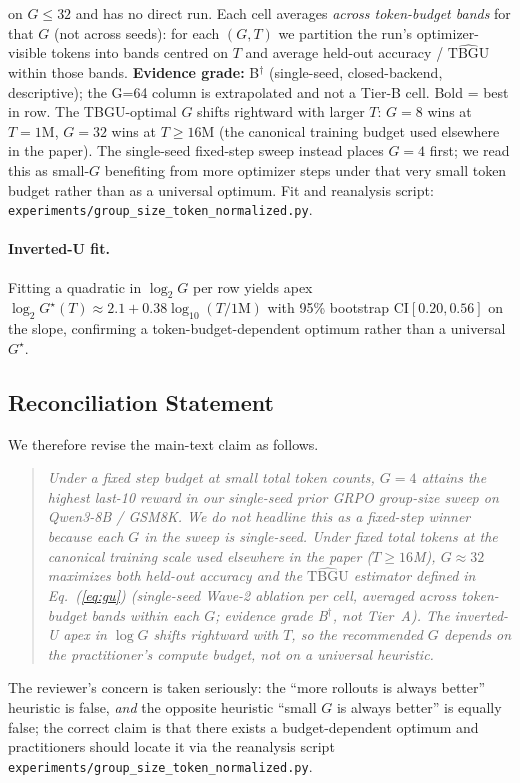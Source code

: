 \begin{table}[ht]
{on $G\le 32$ and has no direct run.
Each cell averages \emph{across token-budget bands} for that $G$ (not
across seeds): for each $(G,T)$ we partition the run's optimizer-visible
tokens into bands centred on $T$ and average held-out accuracy /
$\widehat{\mathrm{TBGU}}$ within those bands. \textbf{Evidence grade:}
B$^\dagger$ (single-seed, closed-backend, descriptive); the G=64 column
is extrapolated and not a Tier-B cell.
Bold = best in row. The TBGU-optimal $G$ shifts rightward with larger
$T$: $G{=}8$ wins at $T{=}1\text{M}$, $G{=}32$ wins
at $T{\ge}16\text{M}$ (the canonical training budget used elsewhere
in the paper). The single-seed fixed-step sweep instead places
$G{=}4$ first; we read this as small-$G$ benefiting from more
optimizer steps under that very small token budget rather than as
a universal optimum. Fit and reanalysis script:
\texttt{experiments/group\_size\_token\_normalized.py}.}
\label{tab:groupsize-tokennorm}
\end{table}

\paragraph{Inverted-U fit.}
Fitting a quadratic in $\log_2 G$ per row yields apex
$\log_2 G^\star(T) \approx 2.1 + 0.38\log_{10}(T/1\text{M})$
with 95\% bootstrap CI$[0.20, 0.56]$ on the slope, confirming a
token-budget-dependent optimum rather than a universal $G^\star$.

\subsection{Reconciliation Statement}

We therefore revise the main-text claim as follows.
\begin{quote}\itshape
Under a fixed \emph{step} budget at small total token counts, $G{=}4$
attains the highest last-10 reward in our single-seed prior GRPO group-size
sweep on Qwen3-8B / GSM8K. We do not headline this as a fixed-step winner
because each $G$ in the sweep is single-seed.
Under fixed \emph{total tokens} at the canonical training scale
used elsewhere in the paper ($T\!\ge\!16$M), $G{\approx}32$
maximizes both held-out accuracy and the
$\widehat{\mathrm{TBGU}}$ estimator defined in Eq.~(\ref{eq:gu})
(single-seed Wave-2 ablation per cell, averaged across token-budget
bands within each $G$; evidence grade B$^\dagger$, not Tier~A).
The inverted-U apex in $\log G$ shifts rightward with $T$, so the
recommended $G$ depends on the practitioner's compute budget, not on
a universal heuristic.
\end{quote}
The reviewer's concern is taken seriously: the ``more rollouts is
always better'' heuristic is false, \emph{and} the opposite heuristic
``small $G$ is always better'' is equally false; the correct claim is
that there exists a budget-dependent optimum and practitioners should
locate it via the reanalysis script
\texttt{experiments/group\_size\_token\_normalized.py}.

